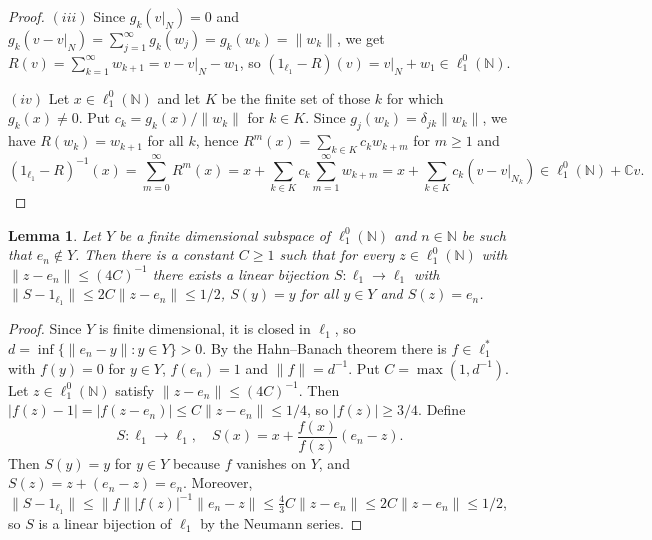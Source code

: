 \documentclass[12pt]{article}
\newtheorem{lemma}[theorem]{Lemma}
\newcommand{\lo}[1]{\ell_1^0(#1)}
\newcommand{\norm}[1]{\lVert #1\rVert}
\begin{document}
\begin{proof}
    $(iii)$ Since $g_k(v|_N)=0$ and
    $g_k(v-v|_N)=\sum_{j=1}^\infty g_k(w_j)=g_k(w_k)=\norm{w_k}$, we get
    $R(v)=\sum_{k=1}^\infty w_{k+1}=v-v|_N-w_1$, so
    $(1_{\ell_1}-R)(v)=v|_N+w_1\in\lo{\mathbb{N}}$.

    $(iv)$ Let $x\in\lo{\mathbb{N}}$ and let $K$ be the finite set of those
    $k$ for which $g_k(x)\neq 0$. Put $c_k=g_k(x)/\norm{w_k}$ for $k\in K$.
    Since $g_j(w_k)=\delta_{jk}\norm{w_k}$, we have $R(w_k)=w_{k+1}$ for all
    $k$, hence $R^m(x)=\sum_{k\in K}c_k w_{k+m}$ for $m\geq 1$ and
    \[
    {(1_{\ell_1}-R)}^{-1}(x)=\sum_{m=0}^\infty R^m(x)
    =x+\sum_{k\in K}c_k\sum_{m=1}^\infty w_{k+m}
    =x+\sum_{k\in K}c_k(v-v|_{N_k})\in\lo{\mathbb{N}}+\mathbb{C}v.
    \]
\end{proof}

\begin{lemma}\label{HittingLemma} Let $Y$ be a finite dimensional subspace
    of $\lo{\mathbb{N}}$ and $n\in\mathbb{N}$ be such that $e_n\notin Y$.
    Then there is a constant $C\geq 1$ such that for every
    $z\in\lo{\mathbb{N}}$ with $\norm{z-e_n}\leq{(4C)}^{-1}$ there exists a
    linear bijection $S:\ell_1\to\ell_1$ with
    $\norm{S-1_{\ell_1}}\leq 2C\norm{z-e_n}\leq 1/2$,
    $S(y)=y$ for all $y\in Y$ and $S(z)=e_n$.
\end{lemma}
\begin{proof} Since $Y$ is finite dimensional, it is closed in $\ell_1$, so
    $d=\inf\{\norm{e_n-y}:y\in Y\}>0$. By the Hahn--Banach theorem there is
    $f\in\ell_1^*$ with $f(y)=0$ for $y\in Y$, $f(e_n)=1$ and $\norm{f}=d^{-1}$.
    Put $C=\max(1,d^{-1})$. Let $z\in\lo{\mathbb{N}}$ satisfy
    $\norm{z-e_n}\leq{(4C)}^{-1}$. Then
    $|f(z)-1|=|f(z-e_n)|\leq C\norm{z-e_n}\leq 1/4$, so $|f(z)|\geq 3/4$.
    Define
    \[
    S:\ell_1\to\ell_1,\quad S(x)=x+\frac{f(x)}{f(z)}(e_n-z).
    \]
    Then $S(y)=y$ for $y\in Y$ because $f$ vanishes on $Y$, and
    $S(z)=z+(e_n-z)=e_n$. Moreover,
    $\norm{S-1_{\ell_1}}\leq\norm{f}|f(z)|^{-1}\norm{e_n-z}\leq
    \frac43 C\norm{z-e_n}\leq 2C\norm{z-e_n}\leq 1/2$, so $S$ is a linear
    bijection of $\ell_1$ by the Neumann series.
\end{proof}
\end{document}
